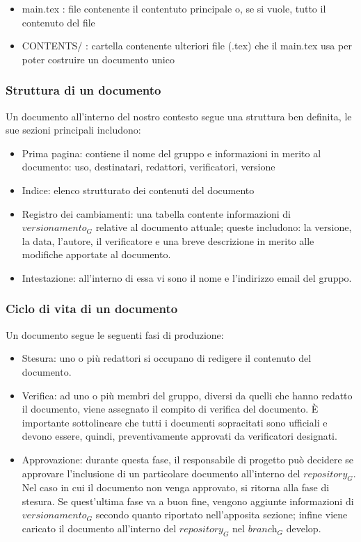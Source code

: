 \begin{itemize}
    \item main.tex : file contenente il contentuto principale o, se si vuole, tutto il contenuto del file
    \item CONTENTS/ : cartella contenente ulteriori file (.tex) che il main.tex usa per poter costruire un documento unico
\end{itemize}

\subsubsection{Struttura di un documento}
Un documento all'interno del nostro contesto segue una struttura ben definita, le sue sezioni principali includono:
\begin{itemize}
    \item Prima pagina: contiene il nome del gruppo e informazioni in merito al documento: uso, destinatari, redattori, verificatori, versione
    \item Indice: elenco strutturato dei contenuti del documento
    \item Registro dei cambiamenti: una tabella contente informazioni di $\textit{versionamento}_G$ relative al documento attuale; queste includono: la versione, la data, l'autore, il verificatore e una breve descrizione in merito alle modifiche apportate al documento.
    \item Intestazione: all'interno di essa vi sono il nome e l'indirizzo email del gruppo.
\end{itemize}

\subsubsection{Ciclo di vita di un documento}
Un documento segue le seguenti fasi di produzione:
\begin{itemize}
    \item Stesura: uno o più redattori si occupano di redigere il contenuto del documento.
    \item Verifica: ad uno o più membri del gruppo, diversi da quelli che hanno redatto il documento, viene assegnato il compito di verifica del documento.
È importante sottolineare che tutti i documenti sopracitati sono ufficiali e devono essere, quindi, preventivamente approvati da verificatori designati.
    \item Approvazione: durante questa fase, il responsabile di progetto può decidere se approvare l'inclusione di un particolare documento all'interno del $\textit{repository}_G$. Nel caso in cui il documento non venga approvato, si ritorna alla fase di stesura.
    Se quest'ultima fase va a buon fine, vengono aggiunte informazioni di $\textit{versionamento}_G$ secondo quanto riportato nell'apposita sezione; infine viene caricato il documento all'interno del $\textit{repository}_G$ nel $\textit{branch}_G$ develop.
\end{itemize}


